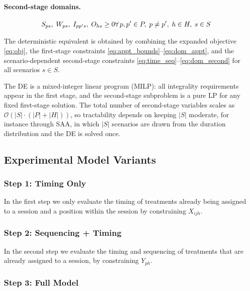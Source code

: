 \paragraph{Second-stage domains.}

\begin{equation}
  S_{ps},\; W_{ps},\; I_{pp's},\; O_{hs} \geq 0 \\
  \forall\, p,p' \in P,\; p \neq p',\; h \in H,\; s \in S
  \label{eq:dom_second}
\end{equation}

The deterministic equivalent is obtained by combining the expanded objective
\eqref{eq:obj}, the first-stage constraints
\eqref{eq:appt_bounds}--\eqref{eq:dom_appt}, and the scenario-dependent
second-stage constraints \eqref{eq:time_seq}--\eqref{eq:dom_second} for all
scenarios $s \in S$.

The DE is a mixed-integer linear program (MILP): all integrality requirements
appear in the first stage, and the second-stage subproblem is a pure LP for
any fixed first-stage solution. The total number of second-stage variables
scales as $\mathcal{O}(|S| \cdot (|P| + |H|))$, so tractability depends on
keeping $|S|$ moderate, for instance through SAA, in which $|S|$ scenarios are drawn from the duration distribution and
the DE is solved once.

\subsection{Experimental Model Variants}

\subsubsection{Step 1: Timing Only}

In the first step we only evaluate the timing of treatments already being
assigned to a session and a position within the session by constraining
$X_{ijh}$.

\subsubsection{Step 2: Sequencing + Timing}

In the second step we evaluate the timing and sequencing of treatments that are
already assigned to a session, by constraining $Y_{ph}$.

\subsubsection{Step 3: Full Model}

